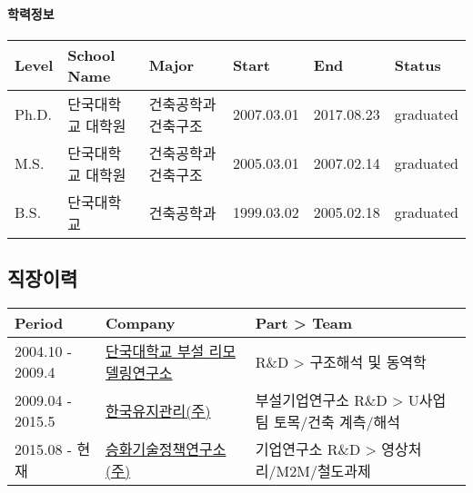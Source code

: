 \documentclass[]{article}
\let\oldparagraph\paragraph
\renewcommand{\paragraph}[1]{\oldparagraph{#1}\mbox{}}
\begin{document}

\paragraph{학력정보}

\begin{tabularx}{\textwidth}{@{}XXXXXX@{}}
\toprule
Level & School Name & Major & Start & End & Status\\
\midrule
Ph.D. & 단국대학교 대학원& 건축공학과 건축구조 &
2007.03.01 & 2017.08.23 & graduated \\
M.S. & 단국대학교 대학원& 건축공학과 건축구조 &
2005.03.01 & 2007.02.14 & graduated \\
B.S. & 단국대학교& 건축공학과 & 1999.03.02 &
2005.02.18 & graduated \\
\bottomrule
\end{tabularx}


\subsection{직장이력}

\begin{tabularx}{\textwidth}{@{}XXX@{}}
\toprule
Period & Company & Part \textgreater{} Team\\
\midrule
2004.10 - 2009.4 & \href{http://www.srrc.re.kr/}{단국대학교 부설
리모델링연구소} & R\&D \textgreater{} 구조해석 및 동역학\\
2009.04 - 2015.5 & \href{http://www.kmbest.co.kr/}{한국유지관리(주)} &
부설기업연구소 R\&D \textgreater{} U사업팀 토목/건축
계측/해석\\
2015.08 - 현재 & \href{http://www.shtpi.co.kr/}{승화기술정책연구소(주)}
& 기업연구소 R\&D \textgreater{} 영상처리/M2M/철도과제\\
\bottomrule
\end{tabularx}
\end{document}
